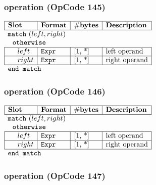 \subsubsection{ operation (OpCode 145)}

\noindent
\(\begin{array}{| l | l | l | l |}
    \hline
    \bf{Slot} & \bf{Format} & \bf{\#bytes} & \bf{Description} \\
    \hline
        \multicolumn{4}{l}{\lst{match}~(left, right)} \\
         
    \multicolumn{4}{l}{~~\lst{otherwise} } \\
    \hline
            ~~~~ left & \lst{Expr} & \text{[1, *]} & \text{left operand} \\
    \hline
          ~~~~ right & \lst{Expr} & \text{[1, *]} & \text{right operand} \\
    \hline
          \multicolumn{4}{l}{\lst{end match}} \\
\end{array}\)
       

\subsubsection{ operation (OpCode 146)}

\noindent
\(\begin{array}{| l | l | l | l |}
    \hline
    \bf{Slot} & \bf{Format} & \bf{\#bytes} & \bf{Description} \\
    \hline
        \multicolumn{4}{l}{\lst{match}~(left, right)} \\
         
    \multicolumn{4}{l}{~~\lst{otherwise} } \\
    \hline
            ~~~~ left & \lst{Expr} & \text{[1, *]} & \text{left operand} \\
    \hline
          ~~~~ right & \lst{Expr} & \text{[1, *]} & \text{right operand} \\
    \hline
          \multicolumn{4}{l}{\lst{end match}} \\
\end{array}\)
       

\subsubsection{ operation (OpCode 147)}


